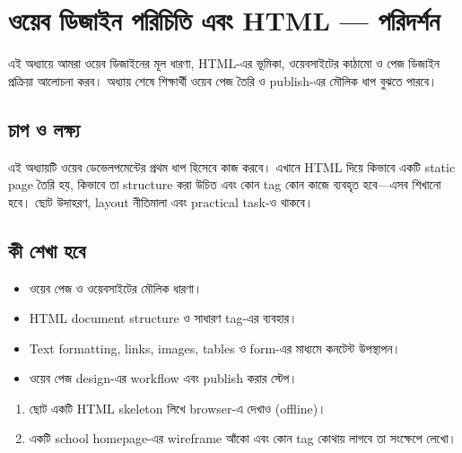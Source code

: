 \section{ওয়েব ডিজাইন পরিচিতি এবং HTML — পরিদর্শন}

\begin{learningbox}
এই অধ্যায়ে আমরা ওয়েব ডিজাইনের মূল ধারণা, HTML-এর ভূমিকা, ওয়েবসাইটের কাঠামো ও পেজ ডিজাইন প্রক্রিয়া আলোচনা করব। অধ্যায় শেষে শিক্ষার্থী ওয়েব পেজ তৈরি ও publish-এর মৌলিক ধাপ বুঝতে পারবে।
\end{learningbox}

\subsection{চাপ ও লক্ষ্য}
এই অধ্যায়টি ওয়েব ডেভেলপমেন্টের প্রথম ধাপ হিসেবে কাজ করবে। এখানে HTML দিয়ে কিভাবে একটি static page তৈরি হয়, কিভাবে তা structure করা উচিত এবং কোন tag কোন কাজে ব্যবহৃত হবে—এসব শিখানো হবে। ছোট উদাহরণ, layout নীতিমালা এবং practical task-ও থাকবে।

\subsection{কী শেখা হবে}
\begin{itemize}
\item ওয়েব পেজ ও ওয়েবসাইটের মৌলিক ধারণা।
\item HTML document structure ও সাধারণ tag-এর ব্যবহার।
\item Text formatting, links, images, tables ও form-এর মাধ্যমে কনটেন্ট উপস্থাপন।
\item ওয়েব পেজ design-এর workflow এবং publish করার স্টেপ।
\end{itemize}

\begin{practicebox}
\begin{enumerate}
\item ছোট একটি HTML skeleton লিখে browser-এ দেখাও (offline)।
\item একটি school homepage-এর wireframe আঁকো এবং কোন tag কোথায় লাগবে তা সংক্ষেপে লেখো।
\end{enumerate}
\end{practicebox}
